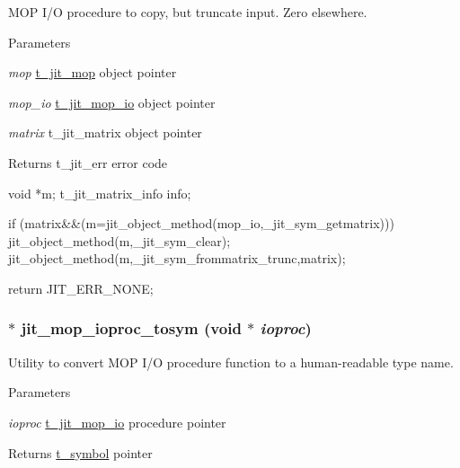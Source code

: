 MOP I/O procedure to copy, but truncate input. Zero elsewhere.


\begin{DoxyParams}{Parameters}
\item[{\em mop}]\hyperlink{structt__jit__mop}{t\_\-jit\_\-mop} object pointer \item[{\em mop\_\-io}]\hyperlink{structt__jit__mop__io}{t\_\-jit\_\-mop\_\-io} object pointer \item[{\em matrix}]t\_\-jit\_\-matrix object pointer\end{DoxyParams}
\begin{DoxyReturn}{Returns}
t\_\-jit\_\-err error code
\end{DoxyReturn}

\begin{DoxyCode}
    void *m;
    t_jit_matrix_info info;
    
    if (matrix&&(m=jit_object_method(mop_io,_jit_sym_getmatrix))) {
        jit_object_method(m,_jit_sym_clear);
        jit_object_method(m,_jit_sym_frommatrix_trunc,matrix);
    }

    return JIT_ERR_NONE;
\end{DoxyCode}
 \hypertarget{group__mopmod_gafa568f8ed923e624872fab658b283995}{
\subsubsection[{jit\_\-mop\_\-ioproc\_\-tosym}]{$\ast$ jit\_\-mop\_\-ioproc\_\-tosym (void $\ast$ {\em ioproc})}}
\label{group__mopmod_gafa568f8ed923e624872fab658b283995}


Utility to convert MOP I/O procedure function to a human-\/readable type name. 
\begin{DoxyParams}{Parameters}
\item[{\em ioproc}]\hyperlink{structt__jit__mop__io}{t\_\-jit\_\-mop\_\-io} procedure pointer\end{DoxyParams}
\begin{DoxyReturn}{Returns}
\hyperlink{structt__symbol}{t\_\-symbol} pointer
\end{DoxyReturn}

